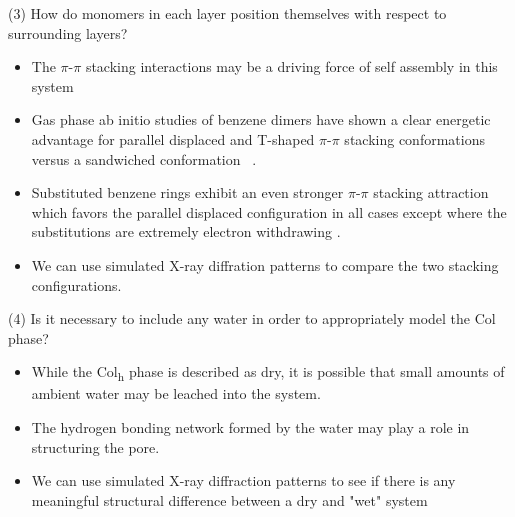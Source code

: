 \documentclass{article}
\begin{document}
   (3) How do monomers in each layer position themselves with respect to surrounding 
   layers?
   \begin{itemize}
      \item The $\pi$-$\pi$ stacking interactions may be a driving force of self assembly 
      in this system\cite{gazit_possible_2002} %
      \item Gas phase ab initio studies of benzene dimers have shown a clear energetic
      advantage for parallel displaced and T-shaped $\pi$-$\pi$ stacking conformations versus a
      sandwiched conformation ~\cite{sinnokrot_estimates_2002}.
      \item Substituted benzene rings exhibit an even stronger $\pi$-$\pi$ stacking 
      attraction which favors the parallel displaced configuration in all cases
      except where the substitutions are extremely electron withdrawing
      \cite{waller_hybrid_2006,ringer_effect_2006}.
      \item We can use simulated X-ray diffration patterns to compare the two 
      stacking configurations. 
   \end{itemize}

   (4) Is it necessary to include any water in order to appropriately model the 
   Col phase?
   \begin{itemize}
	\item While the Col\textsubscript{h} phase is described as dry, it is 
	possible that small amounts of ambient water may be leached into the system.
	\item The hydrogen bonding network formed by the water may play a role 
        in structuring the pore.
	\item We can use simulated X-ray diffraction patterns to see if there is
        any meaningful structural difference between a dry and "wet" system
   \end{itemize}
    
 
\end{document}
